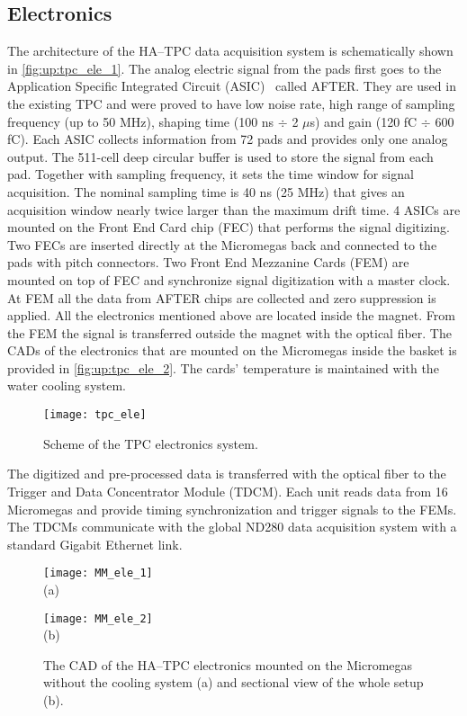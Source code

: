 \documentclass[../main.tex]{subfiles}
\begin{document}
\subsection{Electronics}
\label{sec:up:tpc_ele}
The architecture of the HA--TPC data acquisition system is schematically shown in \autoref{fig:up:tpc_ele_1}. The analog electric signal from the pads first goes to the Application Specific Integrated Circuit (ASIC)~\cite{Baron2007} called AFTER. They are used in the existing TPC and were proved to have low noise rate, high range of sampling frequency (up to 50 MHz), shaping time (100 ns $\div$ 2 $\mu$s) and gain (120 fC $\div$ 600 fC). Each ASIC collects information from 72 pads and provides only one analog output. The 511-cell deep circular buffer is used to store the signal from each pad. Together with sampling frequency, it sets the time window for signal acquisition. The nominal sampling time is 40 ns (25 MHz) that gives an acquisition window nearly twice larger than the maximum drift time. 4 ASICs are mounted on the Front End Card chip (FEC) that performs the signal digitizing. Two FECs are inserted directly at the Micromegas back and connected to the pads with pitch connectors. Two Front End Mezzanine Cards (FEM) are mounted on top of FEC and synchronize signal digitization with a master clock. At FEM all the data from AFTER chips are collected and zero suppression is applied. All the electronics mentioned above are located inside the magnet. From the FEM the signal is transferred outside the magnet with the optical fiber. The CADs of the electronics that are mounted on the Micromegas inside the basket is provided in \autoref{fig:up:tpc_ele_2}. The cards' temperature is maintained with the water cooling system.


\begin{figure}[!ht]
  \centering
  \texttt{[image: tpc\_ele]}
  \caption{Scheme of the TPC electronics system.}
  \label{fig:up:tpc_ele_1}
\end{figure}

The digitized and pre-processed data is transferred with the optical fiber to the Trigger and Data Concentrator Module (TDCM). Each unit reads data from 16 Micromegas and provide timing synchronization and trigger signals to the FEMs. The TDCMs communicate with the global ND280 data acquisition system with a standard Gigabit Ethernet link.

\begin{figure}[!ht]
  \centering
  \begin{minipage}{0.49\linewidth}
    \centering
    \texttt{[image: MM\_ele\_1]} \\ (a)
  \end{minipage}
  \begin{minipage}{0.49\linewidth}
    \centering
    \texttt{[image: MM\_ele\_2]} \\ (b)
  \end{minipage}
  \caption{The CAD of the HA--TPC electronics mounted on the Micromegas without the cooling system (a) and sectional view of the whole setup (b).}
  \label{fig:up:tpc_ele_2}
\end{figure}
\end{document}
